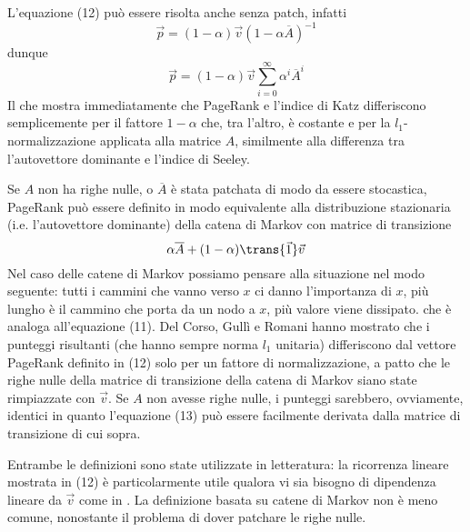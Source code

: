 L'equazione (12) può essere risolta anche senza patch, infatti
\begin{equation}
    \vec{p} = (1 - \alpha)\vec{v}(1 - \alpha\overline{A})^{-1}
\end{equation}
dunque
\begin{equation*}
    \vec{p} = (1 - \alpha)\vec{v}\sum_{i = 0}^{\infty}{\alpha^i\overline{A}^i}
\end{equation*}
Il che mostra immediatamente che PageRank e l'indice di Katz differiscono semplicemente per il fattore $1 - \alpha$ che, tra l'altro, è costante e per la $l_1$-normalizzazione applicata alla matrice $A$, similmente alla differenza tra l'autovettore dominante e l'indice di Seeley.

Se $A$ non ha righe nulle, o $\overline{A}$ è stata patchata di modo da essere stocastica, PageRank può essere definito in modo equivalente alla distribuzione stazionaria (i.e. l'autovettore dominante) della catena di Markov con matrice di transizione
\begin{equation*}
    \alpha\overline{A} + (1 - \alpha)\trans{\vec{1}}\vec{v}
\end{equation*}
Nel caso delle catene di Markov possiamo pensare alla situazione nel modo seguente: tutti i cammini che vanno verso $x$ ci danno l'importanza di $x$, più lungho è il cammino che porta da un nodo a $x$, più valore viene dissipato.
che è analoga all'equazione (11). Del Corso, Gullì e Romani \cite{fastprank} hanno mostrato che i punteggi risultanti (che hanno sempre norma $l_1$ unitaria) differiscono dal vettore PageRank definito in (12) solo per un fattore di normalizzazione, a patto che le righe nulle della matrice di transizione della catena di Markov siano state rimpiazzate con $\vec{v}$. Se $A$ non avesse righe nulle, i punteggi sarebbero, ovviamente, identici in quanto l'equazione (13) può essere facilmente derivata dalla matrice di transizione di cui sopra.

Entrambe le definizioni sono state utilizzate in letteratura: la ricorrenza lineare mostrata in (12) è particolarmente utile qualora vi sia bisogno di dipendenza lineare da $\vec{v}$ come in \cite{boldivigni}. La definizione basata su catene di Markov non è meno comune, nonostante il problema di dover patchare le righe nulle.
